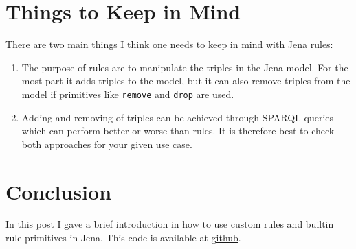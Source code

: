 \documentclass{amsart}
\begin{document}
\section{Things to Keep in Mind}
There are two main things I think one needs to keep in mind with Jena rules:
\begin{enumerate}
 \item The purpose of rules are to manipulate the triples in the Jena model. For the most part it adds triples to the model, but it can also remove triples from the model if primitives like \texttt{remove} and \texttt{drop} are used. 
 \item Adding and removing of triples can be achieved through SPARQL queries which can perform better or worse than rules. It is therefore best to check both approaches for your given use case.
\end{enumerate}

\section{Conclusion}
In this post I gave a brief introduction in how to use custom rules and builtin rule primitives in Jena.
This code is available at \href{http://github.com/henrietteharmse/henrietteharmse/tree/master/blog/tutorial/jena/source/rules/}{github}.
  
  
 
\end{document}
